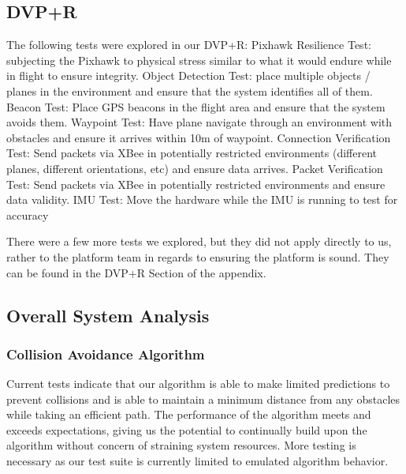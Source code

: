 \documentclass[12pt]{article}
\begin{document}
\subsection{DVP+R}
The following tests were explored in our DVP+R:
Pixhawk Resilience Test: subjecting the Pixhawk to physical stress similar to what it would endure while in flight to ensure integrity.
Object Detection Test: place multiple objects / planes in the environment and ensure that the system identifies all of them.
Beacon Test: Place GPS beacons in the flight area and ensure that the system avoids them.
Waypoint Test: Have plane navigate through an environment with obstacles and ensure it arrives within 10m of waypoint.
Connection Verification Test: Send packets via XBee in potentially restricted environments (different planes, different orientations, etc) and ensure data arrives.
Packet Verification Test: Send packets via XBee in potentially restricted environments and ensure data validity.
IMU Test: Move the hardware while the IMU is running to test for accuracy

There were a few more tests we explored, but they did not apply directly to us, rather to the platform team in regards to ensuring the platform is sound. They can be found in the DVP+R Section of the appendix.

\subsection{Overall System Analysis}
\subsubsection{Collision Avoidance Algorithm}
Current tests indicate that our algorithm is able to make limited predictions to prevent collisions and is able to maintain a minimum distance from any obstacles while taking an efficient path. The performance of the algorithm meets and exceeds expectations, giving us the potential to continually build upon the algorithm without concern of straining system resources. More testing is necessary as our test suite is currently limited to emulated algorithm behavior.
\end{document}
